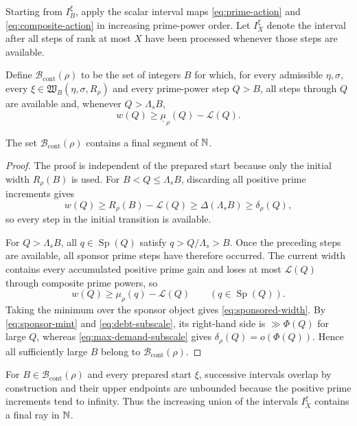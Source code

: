 Starting from $I_B^\xi$, apply the scalar interval maps \eqref{eq:prime-action} and \eqref{eq:composite-action} in increasing prime-power order.  Let $I_X^\xi$ denote the interval after all steps of rank at most $X$ have been processed whenever those steps are available.

Define $\mathcal B_{\mathrm{cont}}(\rho)$ to be the set of integers $B$ for which, for every admissible $\eta,\sigma$, every $\xi\in\mathfrak W_B(\eta,\sigma,R_\rho)$ and every prime-power step $Q>B$, all steps through $Q$ are available and, whenever $Q>\Lambda_sB$,
\begin{equation}\label{eq:sponsored-width}
w(Q)\ge\underline\mu_\rho(Q)-\mathcal L(Q).
\end{equation}

\begin{lemma}[Continuation]\label{lem:component-count-continuation}
The set $\mathcal B_{\mathrm{cont}}(\rho)$ contains a final segment of $\mathbb N$.
\end{lemma}

\begin{proof}
The proof is independent of the prepared start because only the initial width $R_\rho(B)$ is used.  For $B<Q\le\Lambda_sB$, discarding all positive prime increments gives
\[
w(Q)\ge
R_\rho(B)-\mathcal L(Q)
\ge
\Delta(\Lambda_sB)
\ge
\delta_\rho(Q),
\]
so every step in the initial transition is available.

For $Q>\Lambda_sB$, all $q\in\operatorname{Sp}(Q)$ satisfy $q>Q/\Lambda_s>B$.  Once the preceding steps are available, all sponsor prime steps have therefore occurred.  The current width contains every accumulated positive prime gain and loses at most $\mathcal L(Q)$ through composite prime powers, so
\[
w(Q)\ge\mu_\rho(q)-\mathcal L(Q)
\qquad(q\in\operatorname{Sp}(Q)).
\]
Taking the minimum over the sponsor object gives \eqref{eq:sponsored-width}.  By \eqref{eq:sponsor-mint} and \eqref{eq:debt-subscale}, its right-hand side is $\gg\Phi(Q)$ for large $Q$, whereas \eqref{eq:max-demand-subscale} gives $\delta_\rho(Q)=o(\Phi(Q))$.  Hence all sufficiently large $B$ belong to $\mathcal B_{\mathrm{cont}}(\rho)$.
\end{proof}

For $B\in\mathcal B_{\mathrm{cont}}(\rho)$ and every prepared start $\xi$, successive intervals overlap by construction and their upper endpoints are unbounded because the positive prime increments tend to infinity.  Thus the increasing union of the intervals $I_X^\xi$ contains a final ray in $\mathbb N$.

